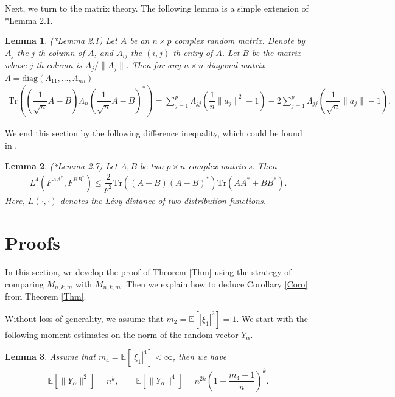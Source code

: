 \documentclass[12pt]{article}
\numberwithin{equation}{section} \theoremstyle{plain}
\newtheorem{lemma}{Lemma}[section]
\def\bE{\mathbb E}
\def\Tr{\mathrm {Tr}}
\def\diag{\mathrm {diag}}
\begin{document}
Next, we turn to the matrix theory. The following lemma is a simple extension of \cite{Jiang2004}*{Lemma 2.1}.
\begin{lemma} (\cite{Jiang2004}*{Lemma 2.1}) \label{Lem-matrix}
Let $A$ be an $n \times p$ complex random matrix. Denote by $A_j$ the $j$-th column of $A$, and $A_{ij}$ the $(i,j)$-th entry of $A$. Let $B$ be the matrix whose $j$-th column is $A_j/\|A_j\|$. Then for any $n \times n$ diagonal matrix $\Lambda = \diag (\Lambda_{11},\ldots,\Lambda_{nn})$
\begin{align*}
    \Tr \left( \left( \dfrac{1}{\sqrt{n}} A - B \right) \Lambda_n \left( \dfrac{1}{\sqrt{n}} A - B \right)^* \right)
    = \sum_{j=1}^p \Lambda_{jj} \left( \dfrac{1}{n} \|a_j\|^2 - 1 \right) - 2 \sum_{j=1}^p \Lambda_{jj} \left( \dfrac{1}{\sqrt{n}} \|a_j\| - 1 \right).
\end{align*}
\end{lemma}

We end this section by the following difference inequality, which could be found in \cite{Bai1999}.
\begin{lemma} (\cite{Bai1999}*{Lemma 2.7}) \label{Lem-preliminary-compare}
Let $A,B$ be two $p \times n$ complex matrices. Then
\begin{align*}
    L^4 \left( F^{AA^*}, F^{BB^*} \right) \le \dfrac{2}{p^2} \Tr \left( (A-B)(A-B)^* \right)  \Tr \left( AA^*+BB^* \right).
\end{align*}
Here, $L(\cdot,\cdot)$ denotes the L\'evy distance of two distribution functions.
\end{lemma}


\section{Proofs} \label{sec-proofs}

In this section, we develop the proof of Theorem \ref{Thm} using the strategy of comparing $M_{n,k,m}$ with $\widetilde M_{n,k,m}$. Then we explain how to deduce Corollary \ref{Coro} from Theorem \ref{Thm}.

Without loss of generality, we assume that $m_2 = \bE [|\xi_1|^2] = 1$.
We start with the following moment estimates on the norm of the random vector $Y_\alpha$.
\begin{lemma} \label{Lem-moment-Y}
Assume that $m_4 = \bE[|\xi_1|^4] < \infty$, then we have
\begin{align*}
    \bE \left[ \|Y_\alpha\|^2 \right]
    = n^k,
    \quad \quad
    \bE \left[ \|Y_\alpha\|^4 \right]
    = n^{2k} \left( 1 + \dfrac{m_4-1}{n} \right)^k.
\end{align*}
\end{lemma}
\end{document}
